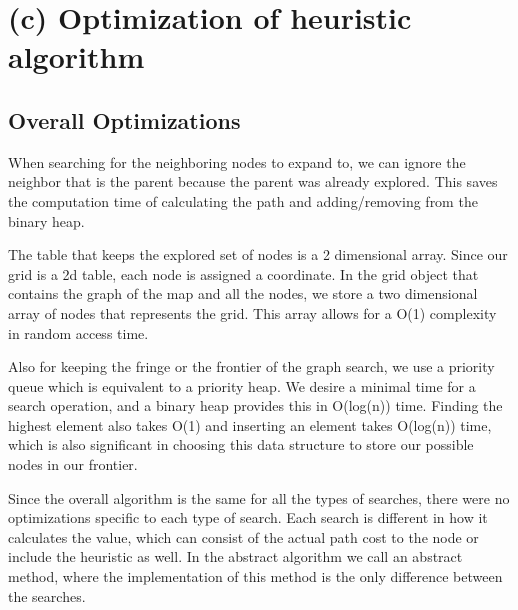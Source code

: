 \section{(c) Optimization of heuristic algorithm}

\subsection{Overall Optimizations}

When searching for the neighboring nodes to expand to, we can ignore the neighbor that is the parent because the parent was already explored. This saves the computation time of calculating the path and adding/removing from the binary heap.

The table that keeps the explored set of nodes is a 2 dimensional array. Since our grid is a 2d table, each node is assigned a coordinate. In the grid object that contains the graph of the map and all the nodes, we store a two dimensional array of nodes that represents the grid. This array allows for a O(1) complexity in random access time.

Also for keeping the fringe or the frontier of the graph search, we use a priority queue which is equivalent to a priority heap. We desire a minimal time for a search operation, and a binary heap provides this in O(log(n)) time. Finding the highest element also takes O(1) and inserting an element takes O(log(n)) time, which is also significant in choosing this data structure to store our possible nodes in our frontier. 

Since the overall algorithm is the same for all the types of searches, there were no optimizations specific to each type of search. Each search is different in how it calculates the value, which can consist of the actual path cost to the node or include the heuristic as well. In the abstract algorithm we call an abstract method, where the implementation of this method is the only difference between the searches.